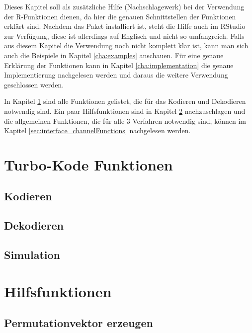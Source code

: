 Dieses Kapitel soll als zusätzliche Hilfe (Nachschlagewerk) bei der Verwendung der R-Funktionen dienen, da hier die genauen Schnittstellen der Funktionen erklärt sind. Nachdem das Paket installiert ist, steht die Hilfe auch im RStudio zur Verfügung, diese ist allerdings auf Englisch und nicht so umfangreich. Falls aus diesem Kapitel die Verwendung noch nicht komplett klar ist, kann man sich auch die Beispiele in Kapitel \ref{cha:examples} anschauen. Für eine genaue Erklärung der Funktionen kann in Kapitel \ref{cha:implementation} die genaue Implementierung nachgelesen werden und daraus die weitere Verwendung geschlossen werden.

In Kapitel \ref{sec:interface_turboFunctions} sind alle Funktionen gelistet, die für das Kodieren und Dekodieren notwendig sind. Ein paar Hilfsfunktionen sind in Kapitel \ref{sec:interface_helperFunctions} nachzuschlagen und die allgemeinen Funktionen, die für alle 3 Verfahren notwendig sind, können im Kapitel \ref{sec:interface_channelFunctions} nachgelesen werden. 
\section{Turbo-Kode Funktionen}
\label{sec:interface_turboFunctions}

\subsection{Kodieren}
\label{sec:interface_encode}


\subsection{Dekodieren}
\label{sec:interface_decode}


\subsection{Simulation}
\label{sec:interface_simulation}


\section{Hilfsfunktionen}
\label{sec:interface_helperFunctions}

\subsection{Permutationvektor erzeugen}
\label{sec:interface_permutation}


